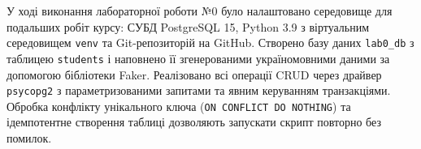 У ході виконання лабораторної роботи №0 було налаштовано середовище для подальших робіт курсу: СУБД PostgreSQL 15, Python 3.9 з віртуальним середовищем \texttt{venv} та Git-репозиторій на GitHub. Створено базу даних \texttt{lab0\_db} з таблицею \texttt{students} і наповнено її згенерованими україномовними даними за допомогою бібліотеки Faker. Реалізовано всі операції CRUD через драйвер \texttt{psycopg2} з параметризованими запитами та явним керуванням транзакціями. Обробка конфлікту унікального ключа (\texttt{ON CONFLICT DO NOTHING}) та ідемпотентне створення таблиці дозволяють запускати скрипт повторно без помилок.


